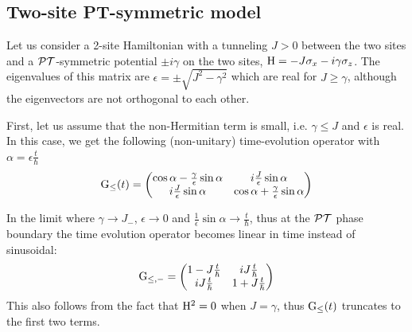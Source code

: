\subsection{Two-site PT-symmetric model}
Let us consider a 2-site Hamiltonian with a tunneling \(J > 0\) between the two
sites and a \(\mathcal{PT}{}\)-symmetric potential \(\pm i \gamma\) on the two sites, \(
\mathrm{H} = -J \sigma_x -i \gamma \sigma_z\). The eigenvalues of this matrix are
\( \epsilon = \pm \sqrt{J^{2} - \gamma^{2}} \) which are real for \( J \geq
\gamma \), although the eigenvectors are not orthogonal to each other.

First, let us assume that the non-Hermitian term is small, i.e. \( \gamma \leq
J \) and \( \epsilon \) is real. In this case, we get the following
(non-unitary) time-evolution operator with \( \alpha = \epsilon \frac{t}{\hbar}
\)
\begin{equation}
  \mathrm{G}_{\leq} \!\left(t\right) = \begin{pmatrix}
    \cos \alpha - \frac{\gamma}{\epsilon} \sin \alpha &
    i \frac{J}{\epsilon} \sin \alpha \\
    i \frac{J}{\epsilon} \sin \alpha &
    \cos \alpha + \frac{\gamma}{\epsilon} \sin \alpha
  \end{pmatrix}
\end{equation}

In the limit where \( \gamma \rightarrow J_{-} \), \( \epsilon \rightarrow 0 \)
and \( \frac{1}{\epsilon} \sin \alpha \rightarrow \frac{t}{\hbar} \), thus at
the \(\mathcal{PT}{}\) phase boundary the time evolution operator becomes linear in time
instead of sinusoidal:
\begin{equation}
  \mathrm{G}_{\leq,-} = \begin{pmatrix}
    1-J\frac{t}{\hbar} & i J\frac{t}{\hbar} \\
    i J\frac{t}{\hbar} & 1+J\frac{t}{\hbar}
  \end{pmatrix}
\end{equation}
This also follows from the fact that \( \mathrm{H}^{2} = 0\) when \(J = \gamma\),
thus \( \mathrm{G}_{\leq} \!\left(t\right) \) truncates to the first two terms.

